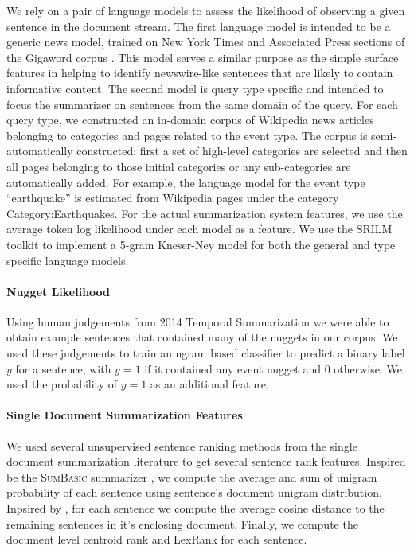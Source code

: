 We rely on a pair of language models to assess the likelihood of observing
a given sentence in the document stream. The first language model is 
intended to be a generic news model, trained on New York Times and 
Associated Press sections of the Gigaword corpus \citep{graff2003english}. 
This model serves a similar purpose as the simple surface features in helping
to identify newswire-like sentences that are likely to contain informative
content.
The second model is query type specific and intended to focus the summarizer
on sentences from the same domain of the query. For each query type, we 
constructed an in-domain corpus of Wikipedia news articles belonging to
categories and pages related to the event type. The corpus is 
semi-automatically constructed: first a set of high-level categories are 
selected and then all pages belonging to those initial categories or
any sub-categories are automatically added. 
For example, the language
model for the event type ``earthquake'' is estimated
from Wikipedia pages under the category Category:Earthquakes.
For the actual summarization system features, we use the average token log
likelihood under each model as a feature.
We use the SRILM toolkit \citep{stolke2002srilm} to implement a 5-gram 
Kneser-Ney model \citep{kneser1995improved} for both the general and type
specific language models. 

\paragraph{Nugget Likelihood}
Using human judgements from 2014 Temporal Summarization we were able to obtain
example sentences that contained many of the nuggets in our corpus. We used
these judgements to train an ngram based classifier to predict a binary 
label $y$ for a sentence, with $y=1$ if it contained any event nugget and
$0$ otherwise. We used the probability of $y=1$ as an additional feature.

\paragraph{Single Document Summarization Features}
We used several unsupervised sentence ranking methods from the single 
document summarization literature to get several sentence rank features.
Inspired be the \textsc{SumBasic} summarizer \citep{nenkova2005impact}, we
compute the average and sum of unigram probability of each sentence using 
sentence's document unigram distribution. Inpsired by \citep{guo2013updating},
for each sentence we compute the average cosine distance to the remaining 
sentences in it's enclosing document. Finally, we compute the document
level centroid rank \citep{radev2000centroid} and LexRank 
\citep{erkan2004lexrank} for each sentence.

